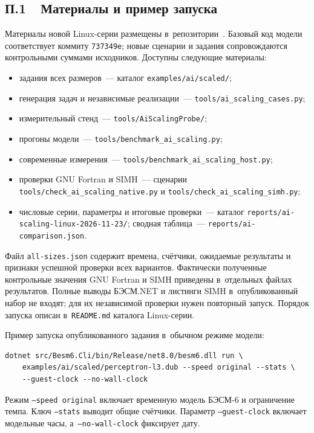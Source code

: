 \documentclass[a4paper,12pt]{article}
\begin{document}
\subsection*{\protect\rmfamily П.1\ \ Материалы и пример запуска}

Материалы новой Linux-серии размещены в~репозитории~\cite{besm6net}. Базовый код модели соответствует коммиту \texttt{737349e}; новые сценарии и задания сопровождаются контрольными суммами исходников. Доступны следующие материалы:
\begin{itemize}\raggedright\itemsep=0pt\parskip=0pt
\item задания всех размеров~--- каталог \texttt{examples/ai/scaled/};
\item генерация задач и независимые реализации~--- \texttt{tools/ai\_scaling\_cases.py};
\item измерительный стенд~--- \texttt{tools/AiScalingProbe/};
\item прогоны модели~--- \texttt{tools/benchmark\_ai\_scaling.py};
\item современные измерения~--- \texttt{tools/benchmark\_ai\_scaling\_host.py};
\item проверки GNU Fortran и SIMH~--- сценарии \texttt{tools/check\_ai\_scaling\_native.py} и \texttt{tools/check\_ai\_scaling\_simh.py};
\item числовые серии, параметры и итоговые проверки~--- каталог \texttt{reports/ai-scaling-linux-2026-11-23/}; сводная таблица~--- \texttt{reports/ai-comparison.json}.
\end{itemize}

Файл \texttt{all-sizes.json} содержит времена, счётчики, ожидаемые результаты и признаки успешной проверки всех вариантов. Фактически полученные контрольные значения GNU Fortran и SIMH приведены в~отдельных файлах результатов. Полные выводы БЭСМ.NET и листинги SIMH в~опубликованный набор не входят; для их независимой проверки нужен повторный запуск. Порядок запуска описан в~\texttt{README.md} каталога Linux-серии.

Пример запуска опубликованного задания в~обычном режиме модели:

{\small
\begin{verbatim}
dotnet src/Besm6.Cli/bin/Release/net8.0/besm6.dll run \
    examples/ai/scaled/perceptron-l3.dub --speed original --stats \
    --guest-clock --no-wall-clock
\end{verbatim}
}

\noindent Режим \texttt{--speed original} включает временную модель БЭСМ-6 и ограничение темпа. Ключ \texttt{--stats} выводит общие счётчики. Параметр \texttt{--guest-clock} включает модельные часы, а~\texttt{--no-wall-clock} фиксирует дату.
\end{document}

